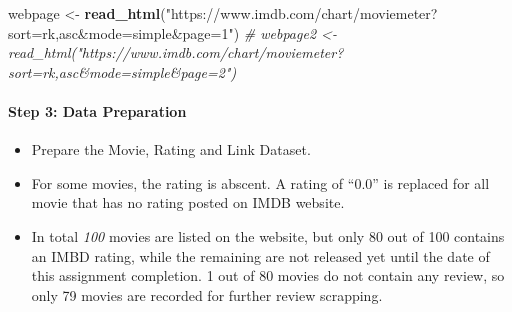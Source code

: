 \documentclass[]{article}
\newenvironment{Shaded}{\begin{snugshade}}{\end{snugshade}}
\newcommand{\KeywordTok}[1]{\textcolor[rgb]{0.13,0.29,0.53}{\textbf{#1}}}
\newcommand{\StringTok}[1]{\textcolor[rgb]{0.31,0.60,0.02}{#1}}
\newcommand{\CommentTok}[1]{\textcolor[rgb]{0.56,0.35,0.01}{\textit{#1}}}
\newcommand{\NormalTok}[1]{#1}
\providecommand{\tightlist}{%
  \setlength{\itemsep}{0pt}\setlength{\parskip}{0pt}}
\let\oldparagraph\paragraph
\renewcommand{\paragraph}[1]{\oldparagraph{#1}\mbox{}}
\begin{document}
\begin{Shaded}
\begin{Highlighting}[]
\NormalTok{webpage <-}\StringTok{ }\KeywordTok{read_html}\NormalTok{(}\StringTok{"https://www.imdb.com/chart/moviemeter?sort=rk,asc&mode=simple&page=1"}\NormalTok{)}
\CommentTok{# webpage2 <- read_html("https://www.imdb.com/chart/moviemeter?sort=rk,asc&mode=simple&page=2")}
\end{Highlighting}
\end{Shaded}

\paragraph{Step 3: Data Preparation}\label{step-3-data-preparation}

\begin{itemize}
\tightlist
\item
  Prepare the Movie, Rating and Link Dataset.
\item
  For some movies, the rating is abscent. A rating of ``0.0'' is
  replaced for all movie that has no rating posted on IMDB website.
\item
  In total \emph{100} movies are listed on the website, but only 80 out
  of 100 contains an IMBD rating, while the remaining are not released
  yet until the date of this assignment completion. 1 out of 80 movies
  do not contain any review, so only 79 movies are recorded for further
  review scrapping.
\end{itemize}
\end{document}
